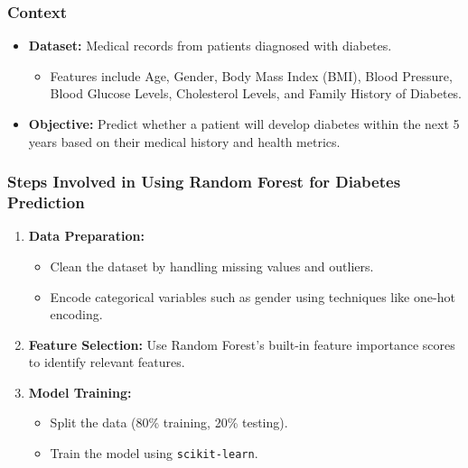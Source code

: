 \documentclass[aspectratio=169]{beamer}
\begin{document}
\begin{frame}
    \frametitle{Context}
    \begin{itemize}
        \item \textbf{Dataset:} Medical records from patients diagnosed with diabetes.
        \begin{itemize}
            \item Features include Age, Gender, Body Mass Index (BMI), Blood Pressure, Blood Glucose Levels, Cholesterol Levels, and Family History of Diabetes.
        \end{itemize}
        \item \textbf{Objective:} Predict whether a patient will develop diabetes within the next 5 years based on their medical history and health metrics.
    \end{itemize}
\end{frame}

\begin{frame}[fragile]
    \frametitle{Steps Involved in Using Random Forest for Diabetes Prediction}
    \begin{enumerate}
        \item \textbf{Data Preparation:}
            \begin{itemize}
                \item Clean the dataset by handling missing values and outliers.
                \item Encode categorical variables such as gender using techniques like one-hot encoding.
            \end{itemize}
        \item \textbf{Feature Selection:} Use Random Forest's built-in feature importance scores to identify relevant features.
        \item \textbf{Model Training:}
            \begin{itemize}
                \item Split the data (80\% training, 20\% testing).
                \item Train the model using \texttt{scikit-learn}.
            \end{itemize}
    \end{enumerate}
\end{frame}
\end{document}
